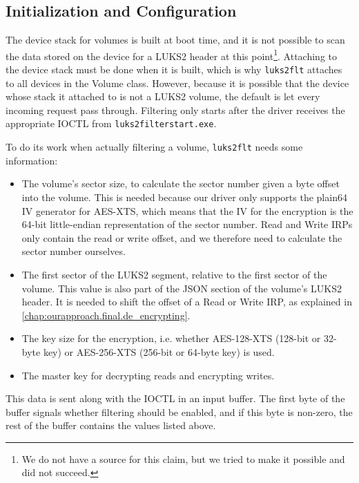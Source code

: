 
\subsection{Initialization and Configuration}
\label{chap:ourapproach.final.init}
The device stack for volumes is built at boot time, and it is not possible to scan the data stored on the device for a LUKS2 header at this point\footnote{\label{fn:ourapproach.final.readatboot} We do not have a source for this claim, but we tried to make it possible and did not succeed.}. Attaching to the device stack must be done when it is built, which is why \texttt{luks2flt} attaches to all devices in the Volume class. However, because it is possible that the device whose stack it attached to is not a LUKS2 volume, the default is let every incoming request pass through. Filtering only starts after the driver receives the appropriate IOCTL from \texttt{luks2filterstart.exe}.

To do its work when actually filtering a volume, \texttt{luks2flt} needs some information:
\begin{itemize}
	\item The volume's sector size, to calculate the sector number given a byte offset into the volume. This is needed because our driver only supports the plain64 IV generator for AES-XTS, which means that the IV for the encryption is the 64-bit little-endian representation of the sector number. Read and Write IRPs only contain the read or write offset, and we therefore need to calculate the sector number ourselves.
	\item The first sector of the LUKS2 segment, relative to the first sector of the volume. This value is also part of the JSON section of the volume's LUKS2 header. It is needed to shift the offset of a Read or Write IRP, as explained in \autoref{chap:ourapproach.final.de_encrypting}.
	\item The key size for the encryption, i.e. whether AES-128-XTS (128-bit or 32-byte key) or AES-256-XTS (256-bit or 64-byte key) is used.
	\item The master key for decrypting reads and encrypting writes.
\end{itemize}
This data is sent along with the IOCTL in an input buffer. The first byte of the buffer signals whether filtering should be enabled, and if this byte is non-zero, the rest of the buffer contains the values listed above.

